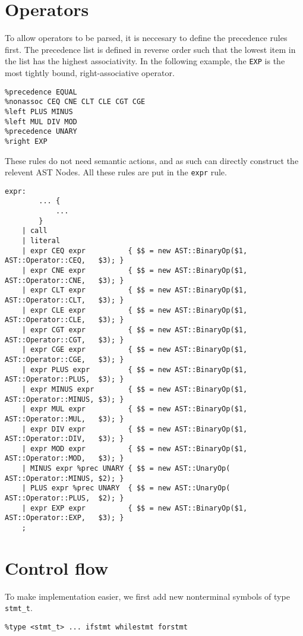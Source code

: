 \documentclass{report}
\begin{document}
	\section{Operators}
To allow operators to be parsed, it is neccesary to define the precedence rules first. The precedence list is defined in reverse order such that the lowest item in the list has the highest associativity. In the following example, the \texttt{EXP} is the most tightly bound, right-associative operator.
\begin{lstlisting}
%precedence EQUAL
%nonassoc CEQ CNE CLT CLE CGT CGE
%left PLUS MINUS
%left MUL DIV MOD
%precedence UNARY
%right EXP
\end{lstlisting}
These rules do not need semantic actions, and as such can directly construct the relevent AST Nodes. All these rules are put in the \texttt{expr} rule.
\begin{lstlisting}[basicstyle=\footnotesize]
expr:
		... {
			...
		}
	| call
	| literal
	| expr CEQ expr          { $$ = new AST::BinaryOp($1, AST::Operator::CEQ,   $3); }
	| expr CNE expr          { $$ = new AST::BinaryOp($1, AST::Operator::CNE,   $3); }
	| expr CLT expr          { $$ = new AST::BinaryOp($1, AST::Operator::CLT,   $3); }
	| expr CLE expr          { $$ = new AST::BinaryOp($1, AST::Operator::CLE,   $3); }
	| expr CGT expr          { $$ = new AST::BinaryOp($1, AST::Operator::CGT,   $3); }
	| expr CGE expr          { $$ = new AST::BinaryOp($1, AST::Operator::CGE,   $3); }
	| expr PLUS expr         { $$ = new AST::BinaryOp($1, AST::Operator::PLUS,  $3); }
	| expr MINUS expr        { $$ = new AST::BinaryOp($1, AST::Operator::MINUS, $3); }
	| expr MUL expr          { $$ = new AST::BinaryOp($1, AST::Operator::MUL,   $3); }
	| expr DIV expr          { $$ = new AST::BinaryOp($1, AST::Operator::DIV,   $3); }
	| expr MOD expr          { $$ = new AST::BinaryOp($1, AST::Operator::MOD,   $3); }
	| MINUS expr %prec UNARY { $$ = new AST::UnaryOp(     AST::Operator::MINUS, $2); }
	| PLUS expr %prec UNARY  { $$ = new AST::UnaryOp(     AST::Operator::PLUS,  $2); }
	| expr EXP expr          { $$ = new AST::BinaryOp($1, AST::Operator::EXP,   $3); }
	;
\end{lstlisting}
	\section{Control flow}
To make implementation easier, we first add new nonterminal symbols of type \texttt{stmt\_t}.
\begin{lstlisting}
%type <stmt_t> ... ifstmt whilestmt forstmt
\end{lstlisting}
\end{document}
